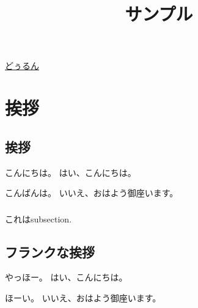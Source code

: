 \documentclass[a4paper,11pt,oneside,openany,report]{jsbook}
\title{サンプル}
\begin{document}
\maketitle
\href{https://twitter.com/NegiIgaiNuki}{どぅるん}

\chapter{挨拶}\label{ch:挨拶}
\section{挨拶}\label{sec:挨拶/挨拶}
こんにちは。
はい、こんにちは。

こんばんは。
いいえ、おはよう御座います。

\subsection{}\label{subsec:挨拶/挨拶/188851569}
これはsubsection.

\section{フランクな挨拶}\label{sec:フランクな挨拶}
やっほー。
はい、こんにちは。

ほーい。
いいえ、おはよう御座います。
\end{document}
